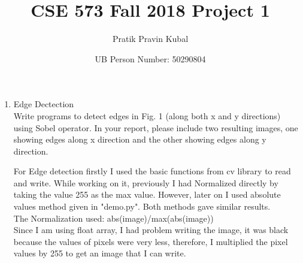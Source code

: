 \documentclass[12pt]{article}
\title{CSE 573 Fall 2018 Project 1}
\author{Pratik Pravin Kubal}
\date{UB Person Number: 50290804}
\newenvironment{QandA}
{
	\begin{enumerate}[label=\normalfont\arabic*.,leftmargin=2em,rightmargin=2em]\normalfont
	}
	{
	\end{enumerate}
}
\newenvironment{answered}{\setlength{\parindent}{1em}\par\normalfont}{}
\begin{document}
	\noindent%
	\maketitle
	\begin{QandA}
		\item Edge Dectection
		\\
			Write programs to detect edges in Fig. 1 (along both x and y directions) using Sobel operator. In your report, please include two resulting images, one showing edges along x direction and the other showing edges along y direction.
	\begin{answered}
		For Edge detection firstly I used the basic functions from cv library to read and write. While working on it, previously I had Normalized directly by taking the value 255 as the max value. However, later on I used absolute values method given in "demo.py". Both methods gave similar results.
		\\
		The Normalization used: 
		abs(image)/max(abs(image))
		\\
		Since I am using float array, I had problem writing the image, it was black because the values of pixels were very less, therefore, I multiplied the pixel values by 255 to get an image that I can write.
		\\
		\begin{figure}
		\centering

\end{figure}
\end{answered}
\end{QandA}
\end{document}
